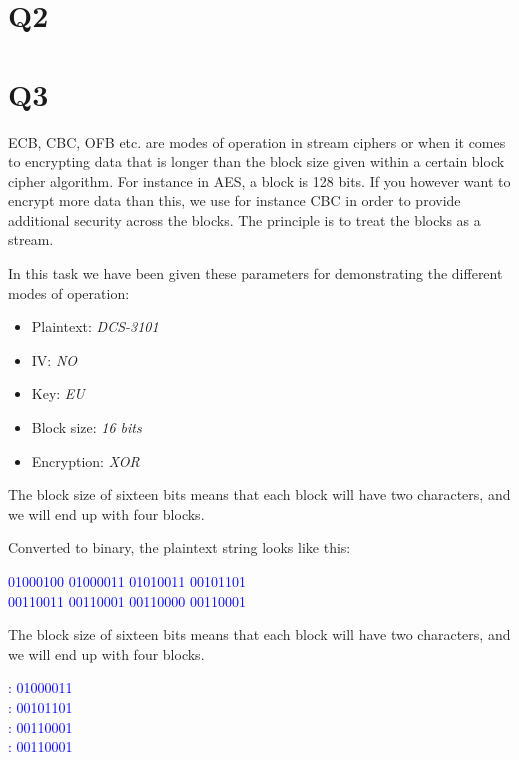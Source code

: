 \documentclass{article}
\begin{document}
\newpage
\section{Q2}
\newpage
\section{Q3}

ECB, CBC, OFB etc. are modes of operation in stream ciphers or when it comes to encrypting data that is longer than the block size given within a certain block cipher algorithm. For instance in AES, a block is 128 bits. If you however want to encrypt more data than this, we use for instance CBC in order to provide additional security across the blocks. The principle is to treat the blocks as a stream.

In this task we have been given these parameters for demonstrating the different modes of operation:
\begin{itemize}
\item{Plaintext: \textit{DCS-3101}}
\item{IV: \textit{NO}}
\item{Key: \textit{EU}}
\item{Block size: \textit{16 bits}}
\item{Encryption: \textit{XOR}}
\end{itemize}

The block size of sixteen bits means that each block will have two characters, and we will end up with four blocks.

Converted to binary, the plaintext string looks like this: 
\begin{tcolorbox}
\begin{center}
\textcolor{blue}{01000100 01000011 01010011 00101101 \\00110011 00110001 00110000 00110001}
\end{center}
\end{tcolorbox}

The block size of sixteen bits means that each block will have two characters, and we will end up with four blocks.

\begin{tcolorbox}
\begin{center}
\textcolor{blue}{
: 01000011\\
: 00101101\\
: 00110001\\
: 00110001}
\end{center}
\end{tcolorbox}
\end{document}
